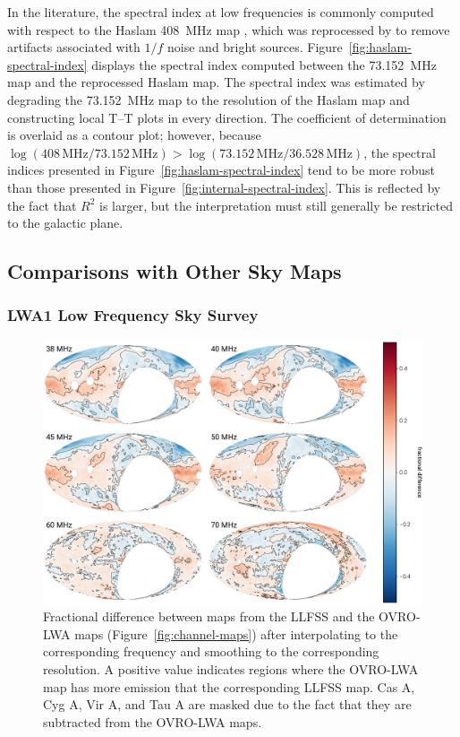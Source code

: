 \begin{bibunit}
In the literature, the spectral index at low frequencies is commonly computed with respect to the
Haslam 408~MHz map \citep{1981A&A...100..209H, 1982A&AS...47....1H}, which was reprocessed by
\citet{2015MNRAS.451.4311R} to remove artifacts associated with $1/f$ noise and bright sources.
Figure~\ref{fig:haslam-spectral-index} displays the spectral index computed between the 73.152~MHz
map and the reprocessed Haslam map. The spectral index was estimated by degrading the 73.152~MHz map
to the resolution of the Haslam map and constructing local T--T plots in every direction. The
coefficient of determination is overlaid as a contour plot; however, because
$\log(408\,\text{MHz}/73.152\,\text{MHz}) > \log(73.152\,\text{MHz}/36.528\,\text{MHz})$, the
spectral indices presented in Figure~\ref{fig:haslam-spectral-index} tend to be more robust than
those presented in Figure~\ref{fig:internal-spectral-index}. This is reflected by the fact that
$R^2$ is larger, but the interpretation must still generally be restricted to the galactic plane.

\subsection{Comparisons with Other Sky Maps}\label{sec:compare}

\subsubsection{LWA1 Low Frequency Sky Survey}

\begin{figure}[t]
    \centering
    \includegraphics[width=\textwidth]{figures/chapter3/lwa1}
    \caption{
        Fractional difference between maps from the LLFSS and the OVRO-LWA maps
        (Figure~\ref{fig:channel-maps}) after interpolating to the corresponding frequency and
        smoothing to the corresponding resolution. A positive value indicates regions where the
        OVRO-LWA map has more emission that the corresponding LLFSS map. Cas A, Cyg A, Vir A, and
        Tau A are masked due to the fact that they are subtracted from the OVRO-LWA maps.
    }
    \label{fig:lwa1-comparison}
\end{figure}


\end{bibunit}
